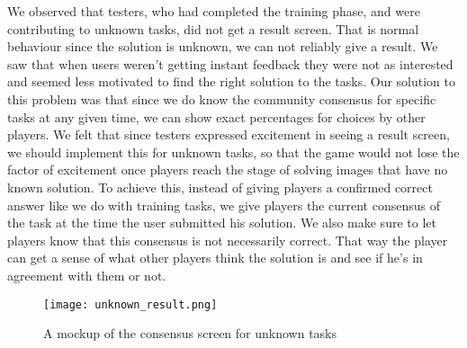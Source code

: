 We observed that testers, who had completed the training phase, and were contributing to unknown tasks, did not get a result screen. That is normal behaviour since the solution is unknown, we can not reliably give a result. We saw that when users weren't getting instant feedback they were not as interested and seemed less motivated to find the right solution to the tasks. Our solution to this problem was that since we do know the community consensus for specific tasks at any given time, we can show exact percentages for choices by other players. We felt that since testers expressed excitement in seeing a result screen, we should implement this for unknown tasks, so that the game would not lose the factor of excitement once players reach the stage of solving images that have no known solution. To achieve this, instead of giving players a confirmed correct answer like we do with training tasks, we give players the current consensus of the task at the time the user submitted his solution. We also make sure to let players know that this consensus is not necessarily correct. That way the player can get a sense of what other players think the solution is and see if he's in agreement with them or not.

\begin{figure}[H]
	\centering
	\graphicspath{ {./graphics/} }
	\centerline{\texttt{[image: unknown\_result.png]}}
	\caption{\label{fig:bdchart}A mockup of the consensus screen for unknown tasks}
\end{figure}